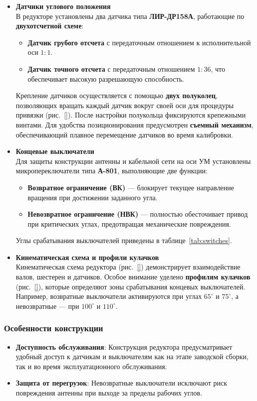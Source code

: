 \begin{itemize}
    \item \textbf{Датчики углового положения} \\
    В редукторе установлены два датчика типа \textbf{ЛИР-ДР158А}, работающие по \textbf{двухотсчетной схеме}:
    \begin{itemize}
        \item \textbf{Датчик грубого отсчета} с передаточным отношением к исполнительной оси \(1:1\).
        \item \textbf{Датчик точного отсчета} с передаточным отношением \(1:36\), что обеспечивает высокую разрешающую способность.
    \end{itemize}
    Крепление датчиков осуществляется с помощью \textbf{двух полуколец}, позволяющих вращать каждый датчик вокруг своей оси для процедуры привязки (рис.~\ref{}). После настройки полукольца фиксируются крепежными винтами. Для удобства позиционирования предусмотрен \textbf{съемный механизм}, обеспечивающий плавное перемещение датчиков во время калибровки.

    \item \textbf{Концевые выключатели} \\
    Для защиты конструкции антенны и кабельной сети на оси УМ установлены микропереключатели типа \textbf{А-801}, выполняющие две функции:
    \begin{itemize}
        \item \textbf{Возвратное ограничение (ВК)} — блокирует текущее направление вращения при достижении заданного угла.
        \item \textbf{Невозвратное ограничение (НВК)} — полностью обесточивает привод при критических углах, предотвращая механические повреждения.
    \end{itemize}
    Углы срабатывания выключателей приведены в таблице~\ref{tab:switches}.

    \item \textbf{Кинематическая схема и профили кулачков} \\
    Кинематическая схема редуктора (рис.~\ref{}) демонстрирует взаимодействие валов, шестерен и датчиков. Особое внимание уделено \textbf{профилям кулачков} (рис.~\ref{}), которые определяют зоны срабатывания концевых выключателей. Например, возвратные выключатели активируются при углах \(65^\circ\) и \(75^\circ\), а невозвратные — при \(100^\circ\) и \(110^\circ\).
\end{itemize}

\subsubsection*{Особенности конструкции}
\begin{itemize}
    \item \textbf{Доступность обслуживания}: Конструкция редуктора предусматривает удобный доступ к датчикам и выключателям как на этапе заводской сборки, так и во время эксплуатационного обслуживания.
    \item \textbf{Защита от перегрузок}: Невозвратные выключатели исключают риск повреждения антенны при выходе за пределы рабочих углов.
\end{itemize}

